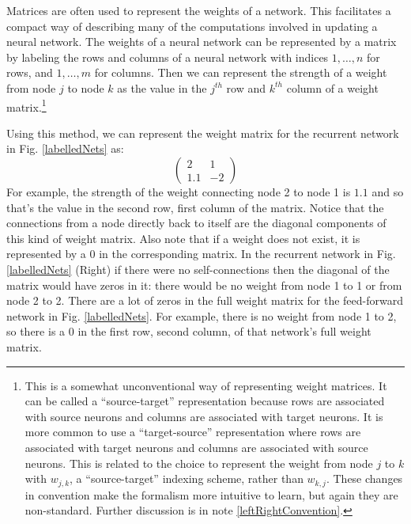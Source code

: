 Matrices are often used to represent the weights of a network. This facilitates a compact way of describing many of the computations involved in updating a neural network. The weights of a neural network can be represented by a matrix by labeling the rows and columns of a neural network with indices $1,\dots,n$ for rows, and $1,\dots,m$ for columns. Then we can represent the strength of a weight from node $j$ to node $k$ as the value in the $j^{th}$ row and $k^{th}$ column of a weight matrix.\footnote{\label{sourceTarget} This is a somewhat unconventional way of representing weight matrices. It can be called a ``source-target'' representation because rows are associated with source neurons and columns are associated with target neurons. It is more common to use a ``target-source'' representation where rows are associated with target neurons and columns are associated with source neurons. This is related to the choice to represent the weight from node $j$ to $k$ with $w_{j,k}$, a ``source-target'' indexing scheme, rather than $w_{k,j}$. These changes in convention make the formalism more intuitive to learn, but again they are non-standard. Further discussion is in note \ref{leftRightConvention}.}

Using this method, we can represent the weight matrix for the recurrent network in Fig. \ref{labelledNets} as:
\[
\begin{pmatrix}
 2  &   1 \\
 1.1  & -2 
\end{pmatrix}
\]
For example, the strength of the weight connecting node 2 to node 1 is $1.1$ and so that's the value in the second row, first column of the matrix. Notice that the connections from a node directly back to itself are the diagonal components of this kind of weight matrix. Also note that if a weight does not exist, it is represented by a $0$ in the corresponding matrix. In the recurrent network in Fig. \ref{labelledNets} (Right)  if there were no self-connections then the diagonal of the matrix would have zeros in it: there would be no weight from node 1 to 1 or from node 2 to 2. There are a lot of zeros in the full weight matrix for the feed-forward network in Fig. \ref{labelledNets}. For example, there is no weight from node 1 to 2, so there is a $0$ in the first row, second column, of that network's full weight matrix.


